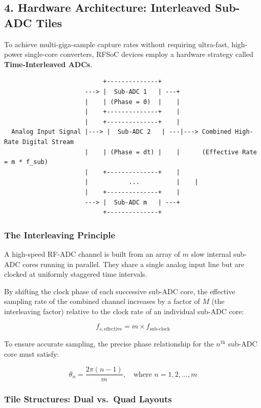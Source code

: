 \documentclass[
]{article}
\begin{document}
\subsection{4. Hardware Architecture: Interleaved Sub-ADC
Tiles}\label{hardware-architecture-interleaved-sub-adc-tiles}

To achieve multi-giga-sample capture rates without requiring ultra-fast,
high-power single-core converters, RFSoC devices employ a hardware
strategy called \textbf{Time-Interleaved ADCs}.

\begin{verbatim}
                           +--------------+
                      ---> |  Sub-ADC 1   | ---+
                      |    | (Phase = 0)  |    |
                      |    +--------------+    |
                      |    +--------------+    |
  Analog Input Signal |---> |  Sub-ADC 2   | ---|---> Combined High-Rate Digital Stream
                      |    | (Phase = dt) |    |      (Effective Rate = m * f_sub)
                      |    +--------------+    |
                      |           ...          |    |
                      |    +--------------+    |
                      ---> |  Sub-ADC m   | ---+
                           +--------------+
\end{verbatim}

\subsubsection{The Interleaving
Principle}\label{the-interleaving-principle}

A high-speed RF-ADC channel is built from an array of \(m\) slow
internal sub-ADC cores running in parallel. They share a single analog
input line but are clocked at uniformly staggered time intervals.

By shifting the clock phase of each successive sub-ADC core, the
effective sampling rate of the combined channel increases by a factor of
\(M\) (the interleaving factor) relative to the clock rate of an
individual sub-ADC core:

\[f_{s,\text{effective}} = m \times f_{\text{sub-clock}}\]

To ensure accurate sampling, the precise phase relationship for the
\(n^{\text{th}}\) sub-ADC core must satisfy:

\[\theta_n = \frac{2\pi(n - 1)}{m}, \quad \text{where } n = 1, 2, \dots, m\]

\subsubsection{Tile Structures: Dual vs.~Quad
Layouts}\label{tile-structures-dual-vs.-quad-layouts}
\end{document}
